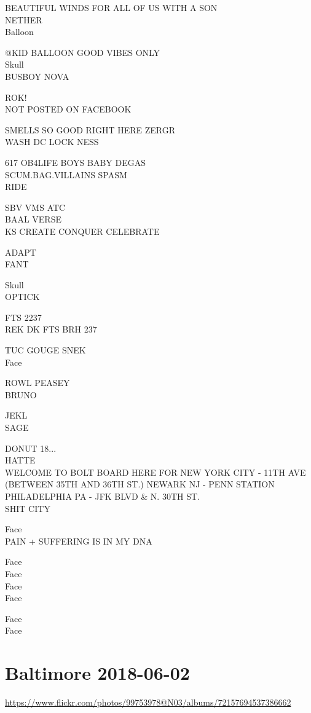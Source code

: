 \documentclass[10pt,letterpaper]{article}
\begin{document}
BEAUTIFUL WINDS FOR ALL OF US WITH A SON\\
NETHER\\
Balloon

@KID BALLOON GOOD VIBES ONLY\\
Skull\\
BUSBOY NOVA

ROK!\\
NOT POSTED ON FACEBOOK

SMELLS SO GOOD RIGHT HERE ZERGR\\
WASH DC LOCK NESS

617 OB4LIFE BOYS BABY DEGAS\\
SCUM.BAG.VILLAINS SPASM\\
RIDE

SBV VMS ATC\\
BAAL VERSE\\
KS CREATE CONQUER CELEBRATE

ADAPT\\
FANT

Skull\\
OPTICK

FTS 2237\\
REK DK FTS BRH 237

TUC GOUGE SNEK\\
Face

ROWL PEASEY\\
BRUNO

JEKL\\
SAGE

DONUT 18...\\
HATTE\\
WELCOME TO BOLT BOARD HERE FOR NEW YORK CITY {-} 11TH AVE (BETWEEN 35TH AND 36TH ST.) NEWARK NJ {-} PENN STATION PHILADELPHIA PA {-} JFK BLVD \& N. 30TH ST.\\
SHIT CITY

Face\\
PAIN + SUFFERING IS IN MY DNA

Face\\
Face\\
Face\\
Face

Face\\
Face
\

\section*{Baltimore 2018-06-02}

\url{https://www.flickr.com/photos/99753978@N03/albums/72157694537386662}
\end{document}
